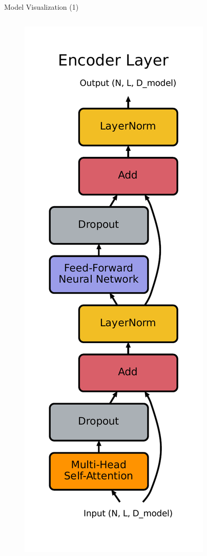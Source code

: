 \documentclass[10pt]{beamer}
\begin{document}
\begin{frame}[fragile]{Model Visualization (1)}
\begin{columns}
\begin{column}{0.3\textwidth}
\begin{figure}
    \centering
    \includegraphics[height=\textheight]{figures/model/encoder-layer.pdf}
\end{figure}    
\end{column}


\end{columns}
\end{frame}
\end{document}
